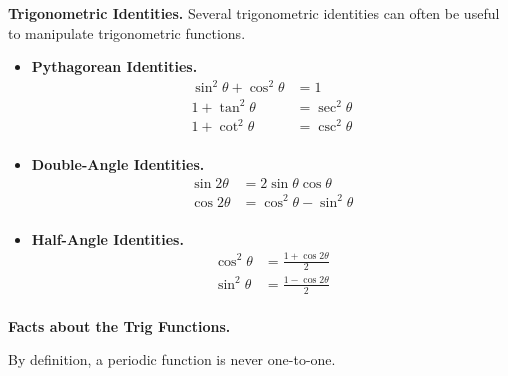 \documentclass[12pt]{article}
\begin{document}
\vspace{40mm}

\textbf{Trigonometric Identities.} Several trigonometric identities can often be useful to manipulate trigonometric functions.
\begin{itemize}
	\item \textbf{Pythagorean Identities.}
	\begin{align*}
	\sin^2\theta + \cos^2\theta &= 1 \\
	1+\tan^2\theta &= \sec^2\theta \\
	1+\cot^2\theta &= \csc^2\theta \\
	\end{align*}
	\item \textbf{Double-Angle Identities.}
	\begin{align*}
	\sin 2\theta &= 2\sin\theta\cos\theta \\
	\cos 2\theta &= \cos^2\theta-\sin^2\theta \\
	\end{align*}
	\item \textbf{Half-Angle Identities.}
	\begin{align*}
	\cos^2\theta &= \frac{1+\cos 2\theta}{2} \\
	\sin^2\theta &= \frac{1-\cos 2\theta}{2} \\
	\end{align*}
\end{itemize}

\newpage 

\textbf{Facts about the Trig Functions.}

\vspace{5mm}


\vspace{5mm}

By definition, a periodic function is never one-to-one.
\end{document}
